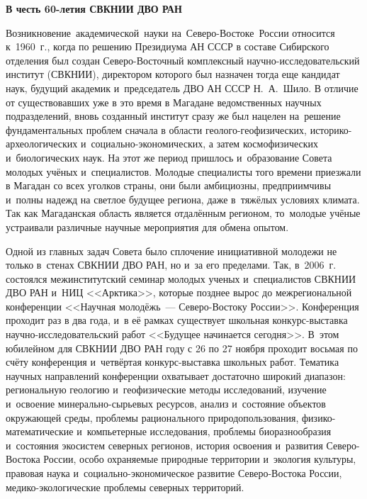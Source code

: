 \begin{center}
  \textbf{В честь 60-летия СВКНИИ ДВО РАН}
\end{center}

Возникновение\,\,\,академической\,\,\,науки\,\,на\,\,\,Северо-Востоке\,\,\,России относится к~1960~г., когда по решению Президиума АН СССР в составе Сибирского отделения был создан Северо-Восточный комплексный научно-исследовательский институт (СВКНИИ), директором которого был назначен тогда еще кандидат наук, будущий академик и~председатель ДВО АН СССР Н.~А.~Шило. В отличие от существовавших уже в это время в Магадане ведомственных научных подразделений, вновь созданный институт сразу же был нацелен на~решение фундаментальных проблем сначала в области геолого-геофизических, историко-археологических и~социально-экономических, а затем космофизических и~биологических наук. На этот же период пришлось и~образование Совета молодых учёных и~специалистов. Молодые специалисты того времени приезжали в Магадан со всех уголков страны, они были амбициозны, предприимчивы и~полны надежд на светлое будущее региона, даже в~тяжёлых условиях климата. Так как Магаданская область является отдалённым регионом, то~молодые учёные устраивали различные научные мероприятия для обмена опытом.

Одной из главных задач Совета было сплочение инициативной молодежи не только в~стенах СВКНИИ ДВО РАН, но и~за его пределами. Так, в~2006~г. состоялся межинститутский семинар молодых ученых и~специалистов СВКНИИ ДВО РАН и~НИЦ <<Арктика>>, которые позднее вырос до межрегиональной конференции <<Научная молодёжь~--- Северо-Востоку России>>. Конференция проходит раз в два года, и~в её рамках существует школьная конкурс-выставка научно-исследовательский работ <<Будущее начинается сегодня>>. В~этом юбилейном для СВКНИИ ДВО РАН году с 26 по 27 ноября проходит восьмая по счёту конференция и~четвёртая конкурс-выставка школьных работ. Тематика научных направлений конференции охватывает достаточно широкий диапазон: региональную геологию и~геофизические методы исследований, изучение и~освоение минерально-сырьевых ресурсов, анализ и~состояние объектов окружающей среды, проблемы рационального природопользования, физико-математические и~компьетерные исследования, проблемы биоразнообразия и~состояния экосистем северных регионов, история освоения и~развития Северо-Востока России, особо охраняемые природные территории и~экология культуры, правовая наука и~социально-экономическое развитие Северо-Востока России, медико-экологические проблемы северных территорий.


